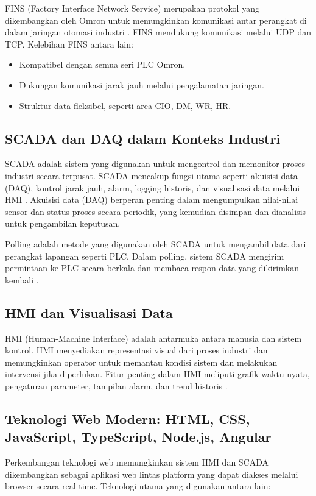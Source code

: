 FINS (Factory Interface Network Service) merupakan protokol yang dikembangkan oleh Omron untuk memungkinkan komunikasi antar perangkat di dalam jaringan otomasi industri \parencite{humaj2021fins}. FINS mendukung komunikasi melalui UDP dan TCP. Kelebihan FINS antara lain:
\begin{itemize}
    \item Kompatibel dengan semua seri PLC Omron.
    \item Dukungan komunikasi jarak jauh melalui pengalamatan jaringan.
    \item Struktur data fleksibel, seperti area CIO, DM, WR, HR.
\end{itemize}

\subsection{SCADA dan DAQ dalam Konteks Industri}
SCADA adalah sistem yang digunakan untuk mengontrol dan memonitor proses industri secara terpusat. SCADA mencakup fungsi utama seperti akuisisi data (DAQ), kontrol jarak jauh, alarm, logging historis, dan visualisasi data melalui HMI \parencite{uddin2022open}. Akuisisi data (DAQ) berperan penting dalam mengumpulkan nilai-nilai sensor dan status proses secara periodik, yang kemudian disimpan dan dianalisis untuk pengambilan keputusan.

Polling adalah metode yang digunakan oleh SCADA untuk mengambil data dari perangkat lapangan seperti PLC. Dalam polling, sistem SCADA mengirim permintaan ke PLC secara berkala dan membaca respon data yang dikirimkan kembali \parencite{omidi2023node}.

\subsection{HMI dan Visualisasi Data}
HMI (Human-Machine Interface) adalah antarmuka antara manusia dan sistem kontrol. HMI menyediakan representasi visual dari proses industri dan memungkinkan operator untuk memantau kondisi sistem dan melakukan intervensi jika diperlukan. Fitur penting dalam HMI meliputi grafik waktu nyata, pengaturan parameter, tampilan alarm, dan trend historis \parencite{seeed2024fuxa}.

\subsection{Teknologi Web Modern: HTML, CSS, JavaScript, TypeScript, Node.js, Angular}
Perkembangan teknologi web memungkinkan sistem HMI dan SCADA dikembangkan sebagai aplikasi web lintas platform yang dapat diakses melalui browser secara real-time. Teknologi utama yang digunakan antara lain:

